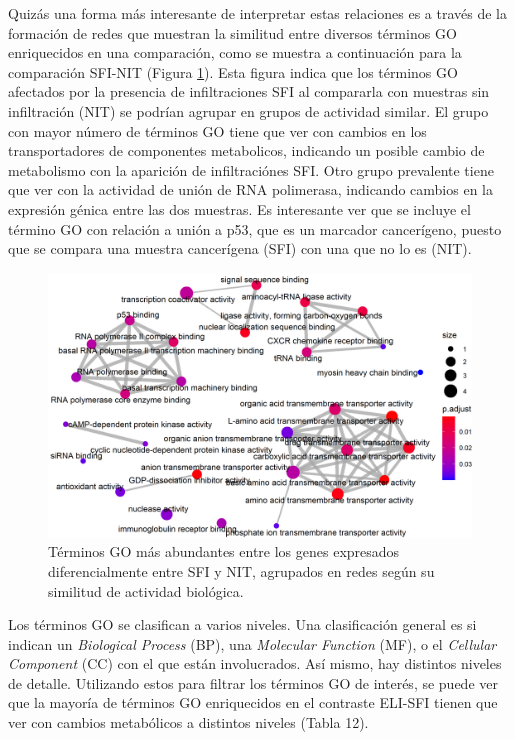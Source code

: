 \documentclass[
]{article}
\begin{document}
Quizás una forma más interesante de interpretar estas relaciones es a
través de la formación de redes que muestran la similitud entre diversos
términos GO enriquecidos en una comparación, como se muestra a
continuación para la comparación SFI-NIT (Figura \ref{fig:Fig17}). Esta
figura indica que los términos GO afectados por la presencia de
infiltraciones SFI al compararla con muestras sin infiltración (NIT) se
podrían agrupar en grupos de actividad similar. El grupo con mayor
número de términos GO tiene que ver con cambios en los transportadores
de componentes metabolicos, indicando un posible cambio de metabolismo
con la aparición de infiltraciónes SFI. Otro grupo prevalente tiene que
ver con la actividad de unión de RNA polimerasa, indicando cambios en la
expresión génica entre las dos muestras. Es interesante ver que se
incluye el término GO con relación a unión a p53, que es un marcador
cancerígeno, puesto que se compara una muestra cancerígena (SFI) con una
que no lo es (NIT).

\begin{figure}

{\centering \includegraphics[width=0.8\linewidth]{results/6.GOterms/2.GOnet} 

}

\caption{Términos GO más abundantes entre los genes expresados diferencialmente entre SFI y NIT, agrupados en redes según su similitud de actividad biológica.}\label{fig:Fig17}
\end{figure}

Los términos GO se clasifican a varios niveles. Una clasificación
general es si indican un \emph{Biological Process} (BP), una
\emph{Molecular Function} (MF), o el \emph{Cellular Component} (CC) con
el que están involucrados. Así mismo, hay distintos niveles de detalle.
Utilizando estos para filtrar los términos GO de interés, se puede ver
que la mayoría de términos GO enriquecidos en el contraste ELI-SFI
tienen que ver con cambios metabólicos a distintos niveles (Tabla 12).
\end{document}
